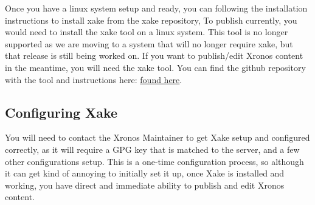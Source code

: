 \documentclass{ximera}
\begin{document}
        Once you have a linux system setup and ready, you can following the installation instructions to install xake from the xake repository, To publish currently, you would need to install the xake tool on a linux system. This tool is no longer supported as we are moving to a system that will no longer require xake, but that release is still being worked on. If you want to publish/edit Xronos content in the meantime, you will need the xake tool. You can find the github repository with the tool and instructions here:
        \href{https://github.com/XimeraProject/xake}{found here}.
        
    \subsection{Configuring Xake}
        
        You will need to contact the Xronos Maintainer to get Xake setup and configured correctly, as it will require a GPG key that is matched to the server, and a few other configurations setup. This is a one-time configuration process, so although it can get kind of annoying to initially set it up, once Xake is installed and working, you have direct and immediate ability to publish and edit Xronos content.
\end{document}
